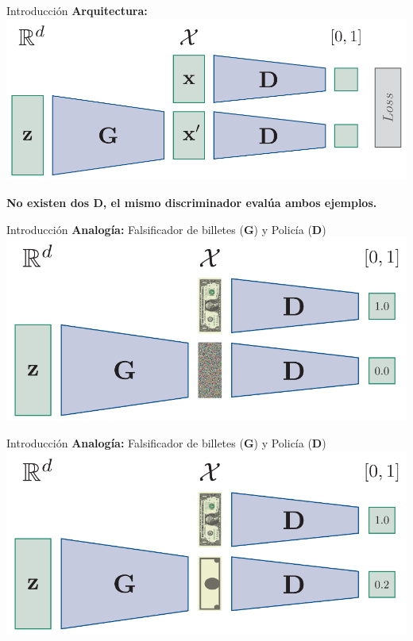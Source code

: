 \documentclass[aspectratio=169]{beamer}
\begin{document}
\begin{frame}{Introducción}
	\textbf{Arquitectura:}\\
	\vspace{.3cm}
	\includegraphics[width=.75\textwidth, center]{imgs/tema4/gan/arch.pdf}\\
	\vspace{.3cm}
	\begin{block}{}
		\center \textbf{No existen dos $\textbf{D}$, el mismo discriminador evalúa ambos ejemplos.}
	\end{block}
\end{frame}

\begin{frame}{Introducción}
	\textbf{Analogía:} Falsificador de billetes ($\textbf{G}$) y Policía ($\textbf{D}$)\\
	\vspace{.3cm}
	\includegraphics[width=.75\textwidth, center]{imgs/tema4/gan/gan_ex1.pdf}\\
	\vspace{.3cm}
\end{frame}

\begin{frame}{Introducción}
	\textbf{Analogía:} Falsificador de billetes ($\textbf{G}$) y Policía ($\textbf{D}$)\\
	\vspace{.3cm}
	\includegraphics[width=.75\textwidth, center]{imgs/tema4/gan/gan_ex2.pdf}\\
	\vspace{.3cm}
\end{frame}
\end{document}
